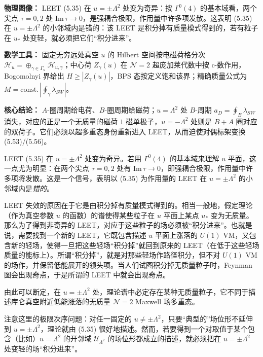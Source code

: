 \begin{keytakeaways}
\item \textbf{物理图像：} LEET (5.35) 在 $u=\pm\Lambda^{2}$ 处变为奇异：按 $\Gamma^{0}(4)$ 的基本域看，两个尖点 $\tau=0,2$ 处 $\mathrm{Im}\,\tau\to0$，是强耦合极限，作用量中许多项发散。这表明 (5.35) 在 $u=\pm\Lambda^{2}$ 的小邻域内是错的：该 LEET 是积分掉有质量模式得到的，若有粒子在 $u_{*}$ 处变轻，就必须把它们“积分进来”。
\item \textbf{数学工具：} 固定无穷远处真空 $u$ 的 Hilbert 空间按电磁荷格分次 $\mathcal{H}_{u}=\oplus_{\gamma\in\Gamma_{u}}\mathcal{H}_{u,\gamma}$；中心荷 $Z_{\gamma}(u)$ 在 $\mathcal{N}=2$ 超庞加莱代数中按 c-数作用，Bogomolnyi 界给出 $H\ge|Z_{\gamma}(u)|$，BPS 态按定义饱和该界；精确质量公式为 $M=\text{const.}\,|\oint_{\gamma}\lambda_{SW}|$。
\item \textbf{核心结论：} $A$-圈周期给电荷、$B$-圈周期给磁荷；$u=\Lambda^{2}$ 处 $B$-周期 $a_{D}=\oint_{B}\lambda_{SW}$ 消失，对应的正是一个无质量的磁荷 $1$ 磁单极子，$u=-\Lambda^{2}$ 处则是 $B+A$ 圈对应的双荷子。它们必须以超多重态身份重新进入 LEET，从而迫使对偶标架变换 (5.53)/(5.56)。
\end{keytakeaways}

LEET (5.35) 在 $u=\pm\Lambda^{2}$ 处变为奇异。若用 $\Gamma^{0}(4)$ 的基本域来理解 $u$ 平面，这一点尤为明显：在两个尖点 $\tau=0,2$ 处有 $\mathrm{Im}\,\tau\to0$，即强耦合极限，作用量中许多项将发散。这是一个信号，表明以 (5.35) 为作用量的 LEET 在 $u=\pm\Lambda^{2}$ 的小邻域内是\emph{错的}。

LEET 失效的原因在于它是由积分掉有质量模式得到的。相当一般地，假定理论（作为真空参数 $u$ 的函数）的谱使得某些粒子在 $u$ 平面上某点 $u_{*}$ 变为无质量。那么为了得到非奇异的 LEET，对应于这些粒子的场必须被“积分进来”。也就是说，需要找到一个新的 LEET，它既包含描述 $u$ 平面上涨落的 $U(1)$ VM，又包含新的轻场，使得一旦把这些轻场“积分掉”就回到原来的 LEET（在低于这些轻场质量的能标上）。所谓“积分掉”，就是对那些轻场作路径积分，但不对 $U(1)$ VM 的场作，并保留低能展开的领头项。当人们试图积分掉无质量粒子时，Feynman 图会出现奇点，于是所谓的 LEET 中就会出现奇点。

由此可以断定，在 $u=\pm\Lambda^{2}$ 处，理论谱中必定存在某种无质量粒子，它不同于描述库仑真空附近低能涨落的无质量 $\mathcal{N}=2$ Maxwell 场多重态。

注意这里的极限次序问题：对任一固定的 $u\neq\pm\Lambda^{2}$，只要“典型的”场位形不延伸到 $u=\pm\Lambda^{2}$，理论就由 (5.35) 很好地描述。然而，若要得到一个对取值于某个包含（比如）$u=\Lambda^{2}$ 的开邻域 $\mathcal{U}_{\Lambda^{2}}$ 的场位形都成立的描述，就必须把在 $u=\pm\Lambda^{2}$ 处变轻的场“积分进来”。

